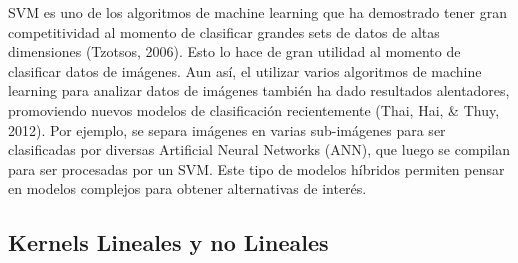 SVM es uno de los algoritmos de machine learning que ha demostrado tener gran competitividad al momento de clasificar grandes sets de datos de altas dimensiones (Tzotsos, 2006). Esto lo hace de gran utilidad al momento de clasificar datos de imágenes. Aun así, el utilizar varios algoritmos de machine learning para analizar datos de imágenes también ha dado resultados alentadores, promoviendo nuevos modelos de clasificación recientemente (Thai, Hai, \& Thuy, 2012). Por ejemplo, se separa imágenes en varias sub-imágenes para ser clasificadas por diversas Artificial Neural Networks (ANN), que luego se compilan para ser procesadas por un SVM. Este tipo de modelos híbridos permiten pensar en modelos complejos para obtener alternativas de interés. 
\subsection{Kernels Lineales y no Lineales}



